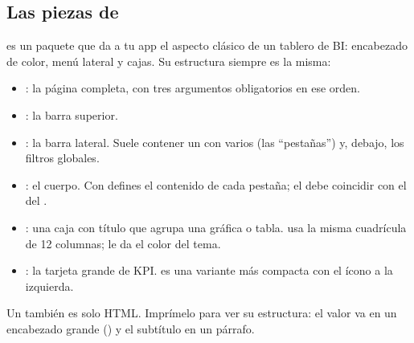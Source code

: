 \subsection{Las piezas de \texorpdfstring{}{shinydashboard}}

 es un paquete que da a tu app el aspecto clásico
de un tablero de BI: encabezado de color, menú lateral y cajas. Su
estructura siempre es la misma:

\begin{itemize}
  \item {}: la página completa,
        con tres argumentos obligatorios en ese orden.
  \item {}: la barra superior.
  \item {}: la barra lateral. Suele contener un
         con varios  (las
        ``pestañas'') y, debajo, los filtros globales.
  \item {}: el cuerpo. Con
         defines el contenido
        de cada pestaña; el  debe coincidir con el del
        .
  \item {}: una caja con título que
        agrupa una gráfica o tabla.  usa la misma cuadrícula de
        12 columnas;  le da el color del tema.
  \item {}: la tarjeta grande
        de KPI.  es una variante más compacta con el ícono
        a la izquierda.
\end{itemize}

Un  también es solo HTML. Imprímelo para ver su
estructura: el valor va en un encabezado grande () y el
subtítulo en un párrafo.


